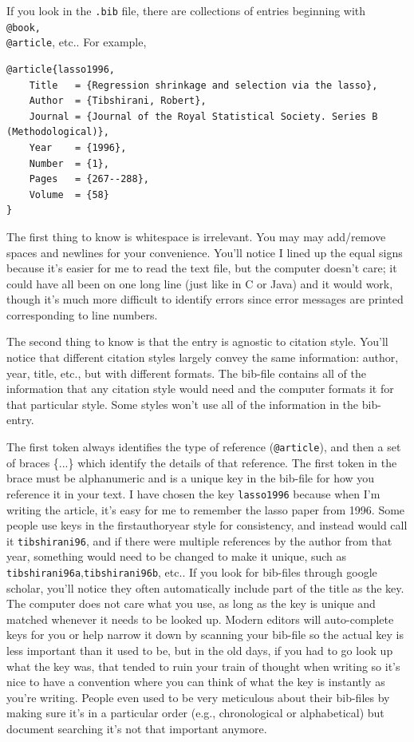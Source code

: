 \documentclass[12pt]{article}
\begin{document}
	If you look in the \texttt{.bib} file, there are collections of entries beginning with \texttt{\\@book,\\@article}, etc.. For example, 
	
	\begin{verbatim}
@article{lasso1996,
    Title   = {Regression shrinkage and selection via the lasso},
    Author  = {Tibshirani, Robert},
    Journal = {Journal of the Royal Statistical Society. Series B (Methodological)},
    Year    = {1996},
    Number  = {1},
    Pages   = {267--288},
    Volume  = {58}
}
	\end{verbatim}
The first thing to know is whitespace is irrelevant. You may may add/remove spaces and newlines for your convenience. You'll notice I lined up the equal signs because it's easier for me to read the text file, but the computer doesn't care; it could have all been on one long line (just like in C or Java) and it would work, though it's much more difficult to identify errors since error messages are printed corresponding to line numbers.

The second thing to know is that the entry is agnostic to citation style. You'll notice that different citation styles largely convey the same information: author, year, title, etc., but with different formats. The bib-file contains all of the information that any citation style would need and the computer formats it for that particular style. Some styles won't use all of the information in the bib-entry.

The first token always identifies the type of reference \mbox{(\texttt{\\@article})}, and then a set of braces \{...\} which identify the details of that reference. The first token in the brace must be alphanumeric and is a unique key in the bib-file for how you reference it in your text. I have chosen the key \texttt{lasso1996} because when I'm writing the article, it's easy for me to remember the lasso paper from 1996. Some people use keys in the firstauthoryear style  for consistency, and instead would call it \texttt{tibshirani96}, and if there were multiple references by the author from that year, something would need to be changed to make it unique, such as \texttt{tibshirani96a},\texttt{tibshirani96b}, etc.. If you look for bib-files through google scholar, you'll notice they often automatically include part of the title as the key. The computer does not care what you use, as long as the key is unique and matched whenever it needs to be looked up. Modern editors will auto-complete keys for you or help narrow it down by scanning your bib-file so the actual key is less important than it used to be, but in the old days, if you had to go look up what the key was, that tended to ruin your train of thought when writing so it's nice to have a convention where you can think of what the key is instantly as you're writing. People even used to be very meticulous about their bib-files by making sure it's in a particular order (e.g., chronological or alphabetical) but document searching it's not that important anymore. 
\end{document}
